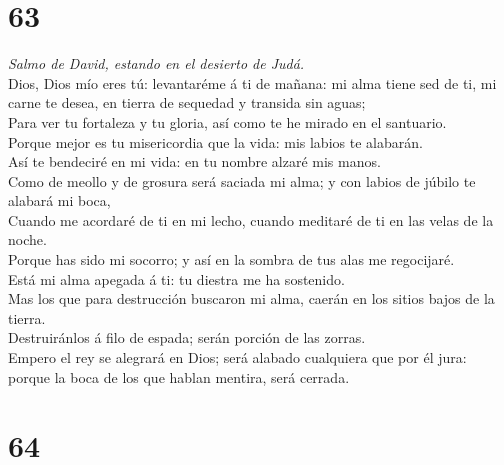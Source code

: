 \hypertarget{section-62}{%
\section{63}\label{section-62}}

 \emph{Salmo de David, estando en el desierto de Judá.}\\
Dios, Dios mío eres tú: levantaréme á ti de mañana: mi alma tiene sed de
ti, mi carne te desea, en tierra de sequedad y transida sin aguas;\\
 Para ver tu fortaleza y tu gloria, así como te he mirado en
el santuario.\\
 Porque mejor es tu misericordia que la vida: mis labios te
alabarán.\\
 Así te bendeciré en mi vida: en tu nombre alzaré mis
manos.\\
 Como de meollo y de grosura será saciada mi alma; y con
labios de júbilo te alabará mi boca,\\
 Cuando me acordaré de ti en mi lecho, cuando meditaré de ti
en las velas de la noche.\\
 Porque has sido mi socorro; y así en la sombra de tus alas
me regocijaré.\\
 Está mi alma apegada á ti: tu diestra me ha sostenido.\\
 Mas los que para destrucción buscaron mi alma, caerán en
los sitios bajos de la tierra.\\
 Destruiránlos á filo de espada; serán porción de las
zorras.\\
 Empero el rey se alegrará en Dios; será alabado cualquiera
que por él jura: porque la boca de los que hablan mentira, será cerrada.

\hypertarget{section-63}{%
\section{64}\label{section-63}}

